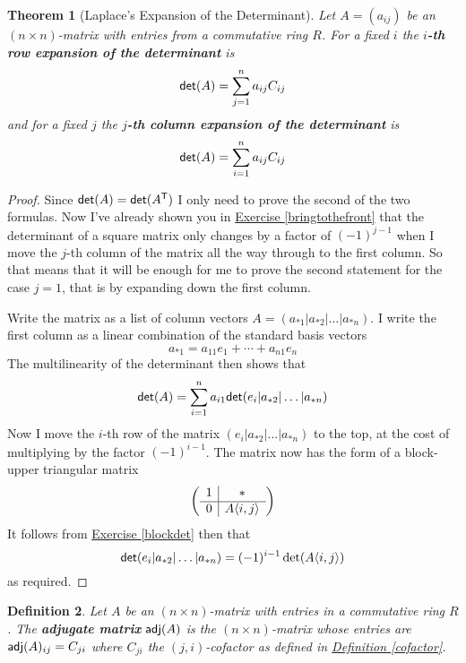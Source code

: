 \documentclass[11pt]{amsbook}
\newtheorem{theorem}{Theorem}[section]
\newtheorem{definition}[theorem]{Definition}
\theoremstyle{definition}
\begin{document}
\begin{theorem} [Laplace's Expansion of the Determinant] \label{laplacedet}
Let $A = (a_{ij})$ be an $(n\times n)$-matrix with entries from a commutative ring $R$. For a fixed $i$ the {\bf $i$-th row expansion of the determinant} is $${\sf det}(A) = \sum_{j=1}^n a_{ij} C_{ij}$$
and for a fixed $j$ the {\bf $j$-th column expansion of the determinant} is $${\sf det}(A) = \sum_{i=1}^n a_{ij} C_{ij}$$
\end{theorem}
\begin{proof}
Since ${\sf det}(A) = {\sf det}(A^{\sf T})$ I only need to prove the second of the two formulas. Now I've already shown you in \hyperref[bringtothefront]{Exercise \ref{bringtothefront}} that the determinant of a square matrix only changes by a factor of $(-1)^{j-1}$ when I move the $j$-th column of the matrix all the way through to the first column. So that means that it will be enough for me to prove the second statement for the case $j=1$, that is by expanding down the first column.

Write the matrix as a list of column vectors $A = (a_{\ast 1}|a_{\ast 2}| \ldots | a_{\ast n})$. I write the first column as a linear combination of the standard basis vectors $$a_{\ast 1} = a_{11} e_1 + \cdots + a_{n1}e_n$$ The multilinearity of the determinant then shows that $${\sf det}(A) = \sum_{i=1}^n a_{i1} {\sf det}(e_i | a_{\ast 2} | \ldots | a_{\ast n})$$ Now I move the $i$-th row of the matrix $(e_i |  a_{\ast 2} | \ldots | a_{\ast n})$ to the top, at the cost of multiplying by the factor $(-1)^{i-1}$. The matrix now has the form of a block-upper triangular matrix
$$
\left(\begin{array}{c|c} 1 & \ast \rule[-1ex]{0pt}{2ex} \\ \hline 0 & A\langle i,j \rangle
\end{array} \right)$$ It follows from \hyperref[blockdet]{Exercise \ref{blockdet}} then that $${\sf det}(e_i | a_{\ast 2} | \ldots | a_{\ast n}) = (-1)^{i-1} \det(A\langle i, j\rangle)$$ as required.  \end{proof}

\begin{definition} \label{defadjugate} Let $A$ be an $(n\times n)$-matrix with entries in a commutative ring $R$. The {\bf adjugate matrix} ${\sf adj}(A)$ is the $(n\times n)$-matrix whose entries are ${\sf adj}(A)_{ij} = C_{ji}$ where $C_{ji}$ the $(j,i)$-cofactor as defined in \hyperref[cofactor]{Definition \ref{cofactor}}.
\end{definition}
\end{document}
